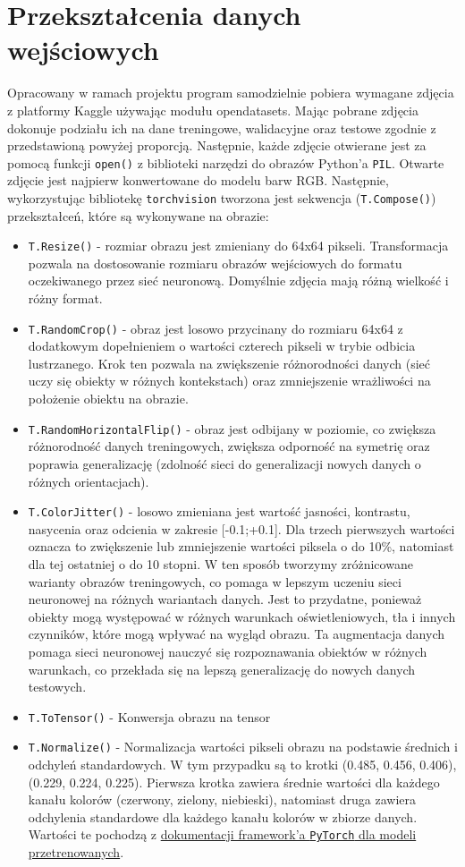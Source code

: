 \documentclass[11pt]{article}
\begin{document}
	\section{Przekształcenia danych wejściowych}
	Opracowany w ramach projektu program samodzielnie pobiera wymagane zdjęcia z platformy Kaggle używając modułu
	opendatasets. Mając pobrane zdjęcia dokonuje podziału ich na dane treningowe, walidacyjne oraz testowe zgodnie z 
	przedstawioną powyżej proporcją.
	Następnie, każde zdjęcie otwierane jest za pomocą funkcji \texttt{open()} z biblioteki narzędzi do obrazów Python'a \texttt{PIL}.
	Otwarte zdjęcie jest najpierw konwertowane do modelu barw RGB. Następnie, wykorzystując bibliotekę \texttt{torchvision}
	tworzona jest sekwencja (\texttt{T.Compose()}) przekształceń, które są wykonywane na obrazie:
	\begin{itemize}
		\item \texttt{T.Resize()} - rozmiar obrazu jest zmieniany do 64x64 pikseli.
			Transformacja pozwala na dostosowanie rozmiaru obrazów wejściowych do formatu oczekiwanego
			przez sieć neuronową. Domyślnie zdjęcia mają różną wielkość i różny format.
		\item \texttt{T.RandomCrop()} - obraz jest losowo przycinany do rozmiaru 64x64 z dodatkowym dopełnieniem o wartości czterech pikseli w trybie odbicia lustrzanego.
			Krok ten pozwala na zwiększenie różnorodności danych (sieć uczy się obiekty w różnych kontekstach) oraz zmniejszenie wrażliwości na położenie obiektu na obrazie.
		\item \texttt{T.RandomHorizontalFlip()} - obraz jest odbijany w poziomie, co zwiększa różnorodność danych treningowych,
			zwiększa odporność na symetrię oraz poprawia generalizację (zdolność sieci do generalizacji nowych danych o różnych orientacjach).
		\item \texttt{T.ColorJitter()} - losowo zmieniana jest wartość jasności, kontrastu, nasycenia oraz odcienia w zakresie [-0.1;+0.1]. Dla trzech pierwszych wartości oznacza to
			zwiększenie lub zmniejszenie wartości piksela o do 10\%, natomiast dla tej ostatniej o do 10 stopni. W ten sposób tworzymy zróżnicowane warianty obrazów treningowych,
			co pomaga w lepszym uczeniu sieci neuronowej na różnych wariantach danych. Jest to przydatne, ponieważ obiekty mogą występować w różnych warunkach oświetleniowych,
			tła i innych czynników, które mogą wpływać na wygląd obrazu. Ta augmentacja danych pomaga sieci neuronowej nauczyć się rozpoznawania obiektów w różnych warunkach,
			co przekłada się na lepszą generalizację do nowych danych testowych.
		\item \texttt{T.ToTensor()} - Konwersja obrazu na tensor 
		\item \texttt{T.Normalize()} - Normalizacja wartości pikseli obrazu na podstawie średnich i odchyleń standardowych. W tym przypadku są to krotki (0.485, 0.456, 0.406), (0.229, 0.224, 0.225).
			Pierwsza krotka zawiera średnie wartości dla każdego kanału kolorów (czerwony, zielony, niebieski), natomiast druga zawiera odchylenia standardowe dla każdego kanału kolorów w zbiorze danych.
			Wartości te pochodzą z \href{https://pytorch.org/vision/stable/models.html}{dokumentacji framework'a \texttt{PyTorch} dla modeli przetrenowanych}.
	\end{itemize}
\end{document}
